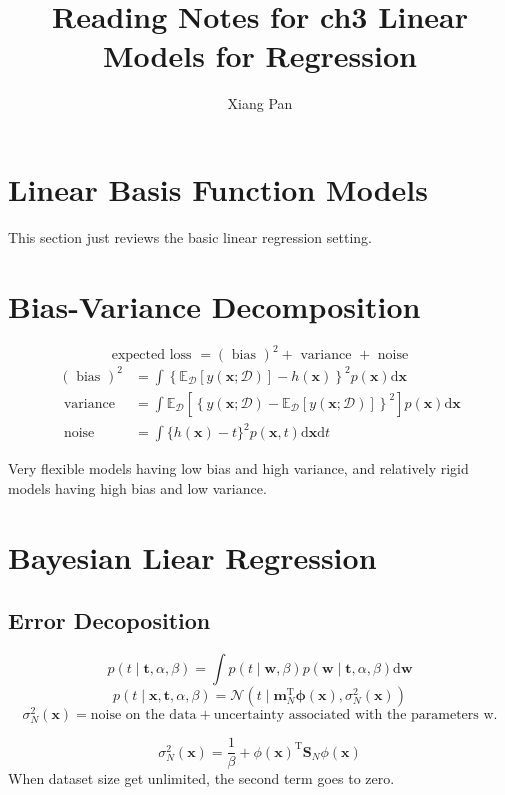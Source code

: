 \documentclass{article}
\title{Reading Notes for ch3 Linear Models for Regression}
\author{Xiang Pan}
\begin{document}
\maketitle
\section{Linear Basis Function Models} 
This section just reviews the basic linear regression setting. 
\section{Bias-Variance Decomposition}
$$
\text { expected loss }=(\text { bias })^{2}+\text { variance }+\text { noise }
$$
$$
\begin{aligned}
(\text { bias })^{2} &=\int\left\{\mathbb{E}_{\mathcal{D}}[y(\mathbf{x} ; \mathcal{D})]-h(\mathbf{x})\right\}^{2} p(\mathbf{x}) \mathrm{d} \mathbf{x} \\
\text { variance } &=\int \mathbb{E}_{\mathcal{D}}\left[\left\{y(\mathbf{x} ; \mathcal{D})-\mathbb{E}_{\mathcal{D}}[y(\mathbf{x} ; \mathcal{D})]\right\}^{2}\right] p(\mathbf{x}) \mathrm{d} \mathbf{x} \\
\text { noise } &=\int\{h(\mathbf{x})-t\}^{2} p(\mathbf{x}, t) \mathrm{d} \mathbf{x} \mathrm{d} t
\end{aligned}
$$

Very flexible models having low bias and high variance, and relatively rigid models having high bias and low variance.
\section{Bayesian Liear Regression}
\subsection{Error Decoposition}
$$
p(t \mid \mathbf{t}, \alpha, \beta)=\int p(t \mid \mathbf{w}, \beta) p(\mathbf{w} \mid \mathbf{t}, \alpha, \beta) \mathrm{d} \mathbf{w}
$$
$$
p(t \mid \mathbf{x}, \mathbf{t}, \alpha, \beta)=\mathcal{N}\left(t \mid \mathbf{m}_{N}^{\mathrm{T}} \boldsymbol{\phi}(\mathbf{x}), \sigma_{N}^{2}(\mathbf{x})\right)
$$
$$
\sigma_{N}^{2}(\mathbf{x})= \text{noise on the data} + \text{uncertainty associated with the parameters w.}
$$

$$
\sigma_{N}^{2}(\mathbf{x})=\frac{1}{\beta}+\phi(\mathbf{x})^{\mathrm{T}} \mathbf{S}_{N} \phi(\mathbf{x})
$$
When dataset size get unlimited, the second term goes to zero.
\end{document}
